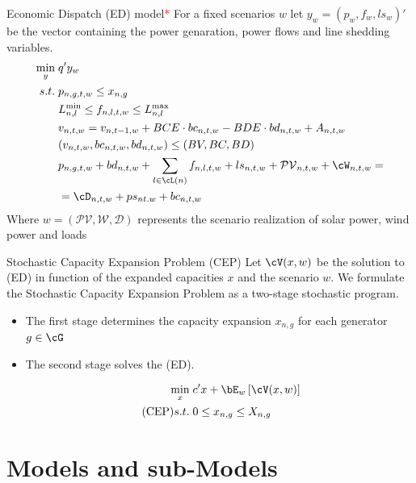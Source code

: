 \documentclass[11pt, aspectratio=169]{beamer}
\begin{document}
\begin{frame}{Economic Dispatch (ED) model\textcolor{red}{*}}
  For a fixed scenarios \(w\) let \: \( y_w = (p_w,f_w,ls_w )'\) be the vector containing the power genaration, power flows and line shedding variables.
  \begin{align}
    \min_{y} \; & q'y_w \\
    s.t. \; & p_{n,g,t,w} \leq x_{n,g} \\
         & L^{\text{min}}_{n, l} \leq f_{n,l,t,w} \leq L^{\text{max}}_{n, l} \\
         & v_{n,t,w} = v_{n,t-1,w} + BCE \cdot bc_{n,t,w} - BDE \cdot bd_{n,t,w} + A_{n,t,w}\\
         & (v_{n,t,w}, bc_{n,t,w}, bd_{n,t,w}) \leq (BV, BC, BD) \\
         & p_{n,g,t,w} + bd_{n,t,w} + \sum_{l \in \cL(n)}f_{n,l,t,w} + ls_{n,t,w} + \mathcal{PV}_{n,t,w} + \cW_{n,t,w} = \\
         & =  \cD_{n,t,w} + ps_{nt.w} + bc_{n,t,w} 
  \end{align}
Where  \(w = (\mathcal{PV}, \mathcal{W}, \mathcal{D})\) represents the scenario realization of solar power, wind power and loads
\end{frame}

\begin{frame}{Stochastic Capacity Expansion Problem (CEP)}
  Let \(\cV(x,w)\) be the solution to (ED) in function of the expanded capacities \(x\) and the scenario \(w\).
  We formulate the Stochastic Capacity Expansion Problem as a two-stage stochastic program.
  \begin{itemize} 
    \item The first stage determines the capacity expansion \(x_{n,g}\) for each generator \(g \in \cG \)
    \item The second stage solves the (ED).
  \end{itemize}  
  \begin{align*}
    \label{CEP-A}
    \min_{x} \;&c'x + \bE_w\left[\cV(x,w)\right] \\  \tag{CEP}
    s.t. \; & 0 \leq x_{n,g} \leq X_{n,g} 
  \end{align*}
 
\end{frame}

\section{Models and sub-Models}
\end{document}
